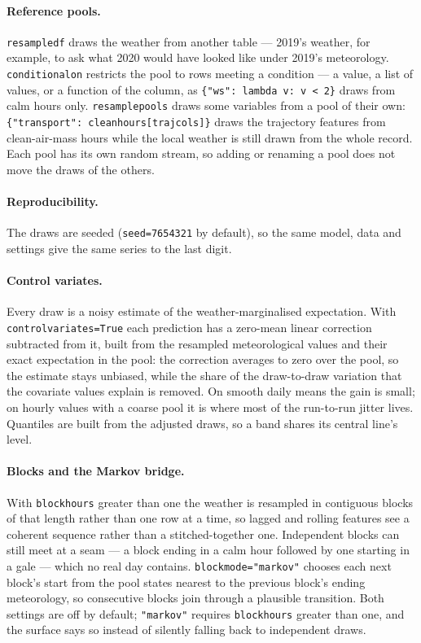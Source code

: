 \documentclass[11pt]{report}
\newcommand{\codeunderscore}{\textunderscore\allowbreak}
\newcommand{\code}[1]{\texttt{\let\_\codeunderscore #1}}
\begin{document}
\paragraph{Reference pools.} \code{resample\_df} draws the weather from another table ---
2019's weather, for example, to ask what 2020 would have looked like under 2019's
meteorology. \code{conditional\_on} restricts the pool to rows meeting a condition --- a value, a list
of values, or a function of the column, as \code{\{"ws": lambda v: v < 2\}} draws from
calm hours only. \code{resample\_pools} draws some variables from a pool of
their own: \code{\{"transport": clean\_hours[traj\_cols]\}} draws the trajectory features
from clean-air-mass hours while the local weather is still drawn from the whole record.
Each pool has its own random stream, so adding or renaming a pool does not move the draws
of the others.

\paragraph{Reproducibility.} The draws are seeded (\code{seed=7654321} by default), so the
same model, data and settings give the same series to the last digit.

\paragraph{Control variates.} Every draw is a noisy estimate of the weather-marginalised
expectation. With \code{control\_variates=True} each prediction has a zero-mean linear
correction subtracted from it, built from the resampled meteorological values and their
exact expectation in the pool: the correction averages to zero over the pool, so the
estimate stays unbiased, while the share of the draw-to-draw variation that the
covariate values explain is removed. On smooth daily means the gain is small; on hourly
values with a coarse pool it is where most of the run-to-run jitter lives. Quantiles
are built from the adjusted draws, so a band shares its central line's level.

\paragraph{Blocks and the Markov bridge.} With \code{block\_hours} greater than one the
weather is resampled in contiguous blocks of that length rather than one row at a time,
so lagged and rolling features see a coherent sequence rather than a stitched-together
one. Independent blocks can still meet at a seam --- a block ending in a calm hour
followed by one starting in a gale --- which no real day contains.
\code{block\_mode="markov"} chooses each next block's start from the pool states
nearest to the previous block's ending meteorology, so consecutive blocks join through
a plausible transition. Both settings are off by default; \code{"markov"} requires
\code{block\_hours} greater than one, and the surface says so instead of silently
falling back to independent draws.
\end{document}
